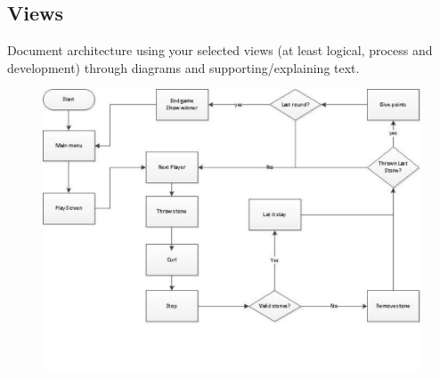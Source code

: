 \subsection{Views}

Document architecture using your selected views (at least logical, process and development) through diagrams and supporting/explaining text.	

\begin{figure}[ht!]
	\centering
	\includegraphics[width=150mm]{view.jpg}
	\label{fig:view}
\end{figure}
